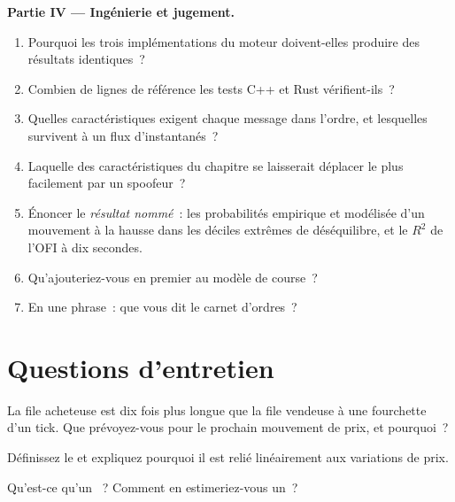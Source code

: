 \begin{problem}
\medskip\noindent\textbf{Partie IV --- Ingénierie et jugement.}
\begin{enumerate}[resume]
\item Pourquoi les trois implémentations du moteur doivent-elles produire des résultats identiques~?
\item Combien de lignes de référence les tests C++ et Rust vérifient-ils~?
\item Quelles caractéristiques exigent chaque message dans l'ordre, et lesquelles survivent à un flux d'instantanés~?
\item Laquelle des caractéristiques du chapitre se laisserait déplacer le plus facilement par un spoofeur~?
\item Énoncer le \emph{résultat nommé}~: les probabilités empirique et modélisée d'un mouvement à la hausse dans les déciles extrêmes de déséquilibre, et le
$R^2$ de l'OFI à dix secondes.
\item Qu'ajouteriez-vous en premier au modèle de course~?
\item En une phrase~: que vous dit le carnet d'ordres~?
\end{enumerate}
\end{problem}

\section{Questions d'entretien}

\begin{interviewq}\label{iq:rs:order-book-features:1}
La file acheteuse est dix fois plus longue que la file vendeuse à une fourchette d'un tick. Que prévoyez-vous pour le prochain mouvement de prix, et pourquoi~?
\end{interviewq}

\begin{interviewq}\label{iq:rs:order-book-features:2}
Définissez le  et expliquez pourquoi il est relié linéairement aux variations de prix.
\end{interviewq}

\begin{interviewq}\label{iq:rs:order-book-features:3}
Qu'est-ce qu'un ~? Comment en estimeriez-vous un~?
\end{interviewq}

